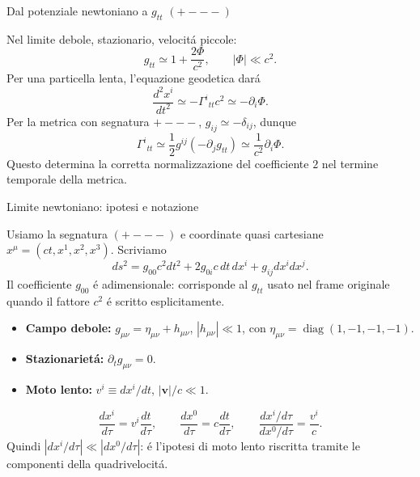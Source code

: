 \begin{frame}[t]{Dal potenziale newtoniano a $g_{tt}$ $(+---)$}\small\raggedright
Nel limite debole, stazionario, velocit\'a piccole:
\[
g_{tt}\simeq1+\frac{2\Phi}{c^2},\qquad |\Phi|\ll c^2.
\]
Per una particella lenta, l'equazione geodetica dar\'a
\[
\frac{d^2x^i}{dt^2}\simeq-\Gamma^i{}_{tt}c^2
\simeq-\partial_i\Phi.
\]
Per la metrica con segnatura $+---$, $g_{ij}\simeq-\delta_{ij}$, dunque
\[
\Gamma^i{}_{tt}\simeq\frac12 g^{ij}(-\partial_jg_{tt})
\simeq\frac{1}{c^2}\partial_i\Phi.
\]
Questo determina la corretta normalizzazione del coefficiente $2$ nel termine temporale della metrica.
\end{frame}


\begin{frame}[t]{Limite newtoniano: ipotesi e notazione}
\small\raggedright
Usiamo la segnatura $(+---)$ e coordinate quasi cartesiane
$x^\mu=(ct,x^1,x^2,x^3)$. Scriviamo
\[
ds^2=g_{00}c^2dt^2+2g_{0i}c\,dt\,dx^i+g_{ij}dx^i dx^j.
\]
Il coefficiente $g_{00}$ \'e adimensionale: corrisponde al $g_{tt}$
usato nel frame originale quando il fattore $c^2$ \'e scritto esplicitamente.
\begin{itemize}
  \item \textbf{Campo debole:}
  $g_{\mu\nu}=\eta_{\mu\nu}+h_{\mu\nu}$, $|h_{\mu\nu}|\ll1$,
  con $\eta_{\mu\nu}=\operatorname{diag}(1,-1,-1,-1)$.
  \item \textbf{Stazionariet\'a:} $\partial_tg_{\mu\nu}=0$.
  \item \textbf{Moto lento:} $v^i\equiv dx^i/dt$, $|\mathbf v|/c\ll1$.
\end{itemize}
\[
\frac{dx^i}{d\tau}=v^i\frac{dt}{d\tau},\qquad
\frac{dx^0}{d\tau}=c\frac{dt}{d\tau},\qquad
\boxed{\frac{dx^i/d\tau}{dx^0/d\tau}=\frac{v^i}{c}.}
\]
Quindi $|dx^i/d\tau|\ll|dx^0/d\tau|$: \'e l'ipotesi di moto lento
riscritta tramite le componenti della quadrivelocit\'a.
\end{frame}

